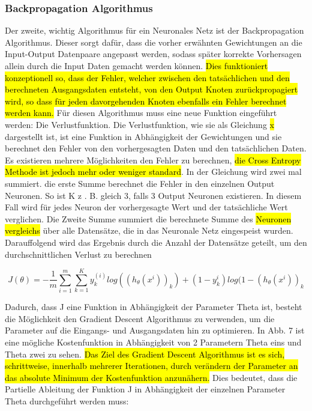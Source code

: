 \subsubsection{Backpropagation Algorithmus}
Der zweite, wichtig Algorithmus für ein Neuronales Netz ist der Backpropagation Algorithmus. Dieser sorgt dafür, dass die vorher erwähnten Gewichtungen an die Input-Output Datenpaare angepasst werden, sodass später korrekte Vorhersagen allein durch die Input Daten gemacht werden können. \hl{Dies funktioniert konzeptionell so, dass der Fehler, welcher zwischen den tatsächlichen und den berechneten Ausgangsdaten entsteht, von den Output Knoten zurückpropagiert wird, so dass für jeden davorgehenden Knoten ebenfalls ein Fehler berechnet werden kann.} Für diesen Algorithmus muss eine neue Funktion eingeführt werden: Die Verlustfunktion. Die Verlustfunktion, wie sie als Gleichung \hl{x} dargestellt ist, ist eine Funktion in Abhängigkeit der Gewichtungen und sie berechnet den Fehler von den vorhergesagten Daten und den tatsächlichen Daten. Es existieren mehrere Möglichkeiten den Fehler zu berechnen, \hl{die Cross Entropy Methode ist jedoch mehr oder weniger standard}. In der Gleichung wird zwei mal summiert. die erste Summe berechnet die Fehler in den einzelnen Output Neuronen. So ist K z . B. gleich 3, falls 3 Output Neuronen existieren. In diesem Fall wird für jedes Neuron der vorhergesagte Wert und der tatsächliche Wert verglichen. Die Zweite Summe summiert die berechnete Summe des \hl{Neuronen vergleichs} über alle Datensätze, die in das Neuronale Netz eingespeist wurden. Darauffolgend wird das Ergebnis durch die Anzahl der Datensätze geteilt, um den durchschnittlichen Verlust zu berechnen


\begin{equation}
\label{Cross Entropy Loss}
J(\theta) = -\frac{1}{m} \sum_{i=1}^{m}\sum_{k=1}^{K}y_k^(i) log((h_\theta(x^i))_k)+ (1 - y_k^i)log(1-(h_\theta(x^i))_k
\end{equation}

Dadurch, dass J eine Funktion in Abhängigkeit der Parameter Theta ist, besteht die Möglichkeit den Gradient Descent Algorithmus zu verwenden, um die Parameter auf die Eingangs- und Ausgangsdaten hin zu optimieren. In Abb. 7 ist eine mögliche Kostenfunktion in Abhängigkeit von 2 Parametern Theta eins und Theta zwei zu sehen. \hl{Das Ziel des Gradient Descent Algorithmus ist es sich, schrittweise, innerhalb mehrerer Iterationen, durch verändern der Parameter an das absolute Minimum der Kostenfunktion anzunähern.} Dies bedeutet, dass die Partielle Ableitung der Funktion J in Abhängigkeit der einzelnen Parameter Theta durchgeführt werden muss:

